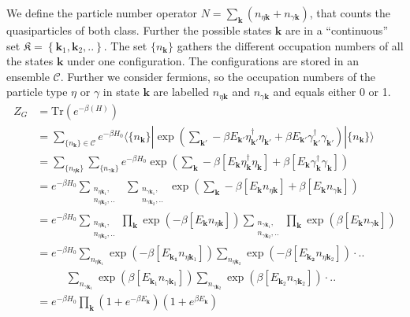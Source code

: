 \documentclass[../main.tex]{subfile}
\begin{document}
We define the particle number operator $N = \sum_{\bm{k}}\left( n_{\eta\bm{k}} + n_{\gamma\bm{k}}\right)$, that counts the quasiparticles of both class. 
Further the possible states $\bm{k}$ are in a ``continuous'' set $\mathfrak{K}= \left\{\bm{k}_1,\bm{k}_2,..\right\}$. The set $\{n_{\bm{k}}\}$ gathers
the different occupation numbers of all the states $\bm{k}$ under one configuration. The configurations are stored in an ensemble $\mathcal{C}$. 
Further we consider fermions, so the occupation numbers of the particle
 type $\eta$ or $\gamma$ in state $\bm{k}$ are labelled $n_{\eta\bm{k}}$ and $n_{\gamma\bm{k}}$ 
 and equals either 0 or 1.
\begin{align*}
    Z_G &= \text{Tr}\left(e^{-\beta( H)}\right)\\
    &= \sum_{\{n_{\bm{k}}\}\in\mathcal{C}} e^{-\beta H_0} \langle \{n_{\bm{k}}\}|\exp\left(\sum_{\bm{k'}}-\beta E_{\bm{k'}}\eta_{\bm{k'}}^{\dagger}\eta_{\bm{k'}} + \beta E_{\bm{k'}}\gamma_{\bm{k'}}^{\dagger}\gamma_{\bm{k'}}\right)|\{n_{\bm{k}}\}\rangle\\
    &= \sum_{\{n_{\eta\bm{k}}\}} \sum_{\{n_{\gamma\bm{k}}\}} e^{-\beta H_0}\exp\left(\sum_{\bm{k}}-\beta \left[E_{\bm{k}}\eta_{\bm{k}}^{\dagger}\eta_{\bm{k}}\right]+ \beta \left[E_{\bm{k}}\gamma_{\bm{k}}^{\dagger}\gamma_{\bm{k}}\right]\right)\\
    &= e^{-\beta H_0} \sum_{\substack{n_{\eta\bm{k}_1},\\ n_{\eta\bm{k}_2},..}} ~~\sum_{\substack{n_{\gamma\bm{k}_1}, \\n_{\gamma\bm{k}_2},..}}\exp\left(\sum_{\bm{k}}-\beta \left[E_{\bm{k}}n_{\eta\bm{k}}\right]+ \beta \left[E_{\bm{k}}n_{\gamma\bm{k}}\right]\right)\\
    &= e^{-\beta H_0} \sum_{\substack{n_{\eta\bm{k}_1},\\ n_{\eta\bm{k}_2},..}} \prod_{\bm{k}}\exp\left(-\beta\left[ E_{\bm{k}}n_{\eta\bm{k}} \right]\right)  \sum_{\substack{n_{\gamma\bm{k}_1}, \\n_{\gamma\bm{k}_2},..}}\prod_{\bm{k}} \exp\left(\beta\left[E_{\bm{k}}n_{\gamma\bm{k}}\right]\right) \\
    &= e^{-\beta H_0} \sum_{n_{\eta\bm{k}_1}}\exp\left(-\beta\left[E_{\bm{k_1}}n_{\eta\bm{k}_1} \right]\right)\sum_{n_{\eta\bm{k}_2}}\exp\left(-\beta\left[E_{\bm{k_2}}n_{\eta\bm{k}_2} \right]\right)\cdot..  \\
    &~~~~~~~~~~~~\sum_{n_{\gamma\bm{k}_1}} \exp\left(\beta\left[E_{\bm{k}_1}n_{\gamma\bm{k}_1}\right]\right)\sum_{n_{\gamma\bm{k}_2}} \exp\left(\beta\left[E_{\bm{k}_2}n_{\gamma\bm{k}_2}\right]\right)\cdot..\\
    &= e^{-\beta H_0} \prod_{\bm{k}}  \left(1 + e^{-\beta E_{\bm{k}}}\right) \left(1 + e^{\beta E_{\bm{k}}}\right) \\
\end{align*}
\end{document}
